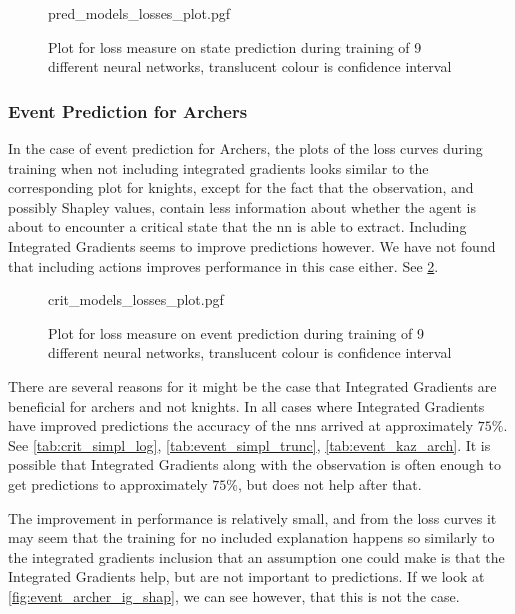\documentclass[UKenglish]{uiomasterthesis}
\begin{document}
\begin{figure}[H]
\centering
{pred_models_losses_plot.pgf}
\caption{Plot for loss measure on state prediction during training of 9 different neural networks, translucent colour is confidence interval}
\label{fig:state_knight_losses}
\end{figure}

\subsubsection{Event Prediction for Archers}

In the case of event prediction for Archers, the plots of the loss curves during training when not including integrated gradients looks similar to the corresponding plot for knights, except for the fact that the observation, and possibly Shapley values, contain less information about whether the agent is about to encounter a critical state that the \ac{nn} is able to extract. Including Integrated Gradients seems to improve predictions however. We have not found that including actions improves performance in this case either. See \cref{fig:event_archer_losses}.

\begin{figure}[H]
\centering
{crit_models_losses_plot.pgf}
\caption{Plot for loss measure on event prediction during training of 9 different neural networks, translucent colour is confidence interval}
\label{fig:event_archer_losses}
\end{figure}

There are several reasons for it might be the case that Integrated Gradients are beneficial for archers and not knights. In all cases where Integrated Gradients have improved predictions the accuracy of the \acp{nn} arrived at approximately $75\%$. See \cref{tab:crit_simpl_log}, \cref{tab:event_simpl_trunc}, \cref{tab:event_kaz_arch}. It is possible that Integrated Gradients along with the observation is often enough to get predictions to approximately $75\%$, but does not help after that.

The improvement in performance is relatively small, and from the loss curves it may seem that the training for no included explanation happens so similarly to the integrated gradients inclusion that an assumption one could make is that the Integrated Gradients help, but are not important to predictions. If we look at \cref{fig:event_archer_ig_shap}, we can see however, that this is not the case.
\end{document}
